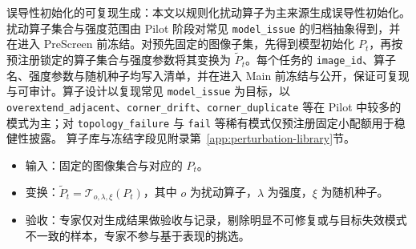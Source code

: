 \noindent 误导性初始化的可复现生成：本文以规则化扰动算子为主来源生成误导性初始化。扰动算子集合与强度范围由 Pilot 阶段对常见 \texttt{model\_issue} 的归档抽象得到，并在进入 PreScreen 前冻结。对预先固定的图像子集，先得到模型初始化 $P_t$，再按预注册锁定的算子集合与强度参数将其变换为 $\tilde{P}_t$。每个任务的 \texttt{image\_id}、算子名、强度参数与随机种子均写入清单，并在进入 Main 前冻结与公开，保证可复现与可审计。算子设计以复现常见 \texttt{model\_issue} 为目标，以 \texttt{overextend\_adjacent}、\texttt{corner\_drift}、\texttt{corner\_duplicate} 等在 Pilot 中较多的模式为主；对 \texttt{topology\_failure} 与 \texttt{fail} 等稀有模式仅预注册固定小配额用于稳健性披露。
算子库与冻结字段见附录第~\ref{app:perturbation-library}节。
\begin{itemize}
    \item 输入：固定的图像集合与对应的 $P_t$。
    \item 变换：$\tilde{P}_t=\mathcal{T}_{o,\lambda,\xi}\!\left(P_t\right)$，其中 $o$ 为扰动算子，$\lambda$ 为强度，$\xi$ 为随机种子。
    \item 验收：专家仅对生成结果做验收与记录，剔除明显不可修复或与目标失效模式不一致的样本，专家不参与基于表现的挑选。
\end{itemize}

